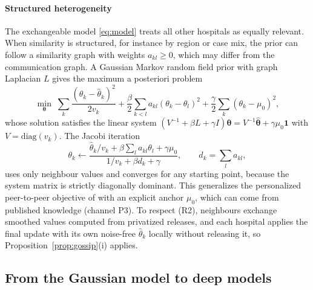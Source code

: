 \documentclass[acmsmall,screen,review]{acmart}
\theoremstyle{acmdefinition}
\begin{document}
\paragraph{Structured heterogeneity} The exchangeable model \eqref{eq:model} treats all other hospitals as equally relevant. When similarity is structured, for instance by region or case mix, the prior can follow a similarity graph with weights $a_{kl}\ge 0$, which may differ from the communication graph. A Gaussian Markov random field prior \cite{rue2005gaussian} with graph Laplacian $L$ gives the maximum a posteriori problem
\begin{equation}\label{eq:gmrf}
\min_{\boldsymbol{\theta}}\;\sum_k\frac{(\theta_k-\hat{\theta}_k)^2}{2v_k}+\frac{\beta}{2}\sum_{k<l}a_{kl}(\theta_k-\theta_l)^2+\frac{\gamma}{2}\sum_k(\theta_k-\mu_0)^2,
\end{equation}
whose solution satisfies the linear system $(V^{-1}+\beta L+\gamma I)\boldsymbol{\theta}=V^{-1}\hat{\boldsymbol{\theta}}+\gamma\mu_0\mathbf{1}$ with $V=\mathrm{diag}(v_k)$. The Jacobi iteration
\[
\theta_k\leftarrow\frac{\hat{\theta}_k/v_k+\beta\sum_l a_{kl}\theta_l+\gamma\mu_0}{1/v_k+\beta d_k+\gamma},\qquad d_k=\textstyle\sum_l a_{kl},
\]
uses only neighbour values and converges for any starting point, because the system matrix is strictly diagonally dominant. This generalizes the personalized peer-to-peer objective of \citet{vanhaesebrouck2017decentralized} with an explicit anchor $\mu_0$, which can come from published knowledge (channel P3). To respect (R2), neighbours exchange smoothed values computed from privatized releases, and each hospital applies the final update with its own noise-free $\hat{\theta}_k$ locally without releasing it, so Proposition~\ref{prop:gossip}(i) applies.

\subsection{From the Gaussian model to deep models}\label{sec:S8_5}
\end{document}
